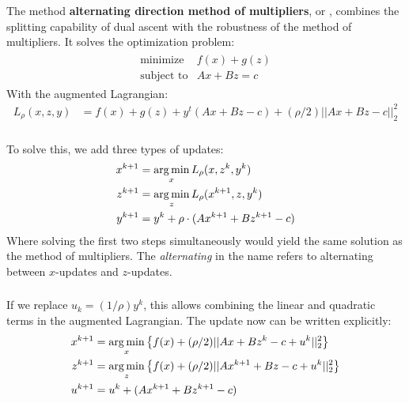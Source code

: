 \begin{frame}[fragile] \frametitle{}

The method \textbf{alternating direction method of multipliers}, or ,
combines the splitting capability of dual ascent with the robustness
of the method of multipliers. It solves the optimization problem:
\begin{align*}
\begin{array}{ll}
\text{minimize} & f(x) + g(z) \\
\text{subject to} & Ax + Bz = c
\end{array}
\end{align*}
With the augmented Lagrangian:
\begin{align*}
L_\rho (x, z, y) &= f(x) + g(z) + y^t (Ax + Bz - c) + \left(\rho / 2\right)|| Ax + Bz - c ||_2^2
\end{align*}

\end{frame}

\begin{frame}[fragile] \frametitle{}

To solve this, we add three types of updates:
\begin{align*}
x^{k+1} &= \mathop{\mathrm{arg\,min}}_x L_\rho (x, z^k, y^k) \\
z^{k+1} &= \mathop{\mathrm{arg\,min}}_z L_\rho (x^{k+1}, z, y^k) \\
y^{k+1} &= y^{k} + \rho \cdot (A x^{k+1} + B z^{k+1} - c)
\end{align*}
Where solving the first two steps simultaneously would yield the
same solution as the method of multipliers. The \textit{alternating}
in the name refers to alternating between $x$-updates and $z$-updates.

\end{frame}

\begin{frame}[fragile] \frametitle{}

If we replace $u_k = (1/\rho) y^k$, this allows combining the linear and
quadratic terms in the augmented Lagrangian. The update now can be written
explicitly:
\begin{align*}
x^{k+1} &= \mathop{\mathrm{arg\,min}}_x \left\{ f(x) + (\rho / 2) || A x + B z^{k} - c + u^k ||_2^2 \right\} \\
z^{k+1} &= \mathop{\mathrm{arg\,min}}_z \left\{ f(x) + (\rho / 2) || A x^{k+1} + B z - c + u^k ||_2^2 \right\} \\
u^{k+1} &= u^{k} + (A x^{k+1} + B z^{k+1} - c)
\end{align*}

\end{frame}

